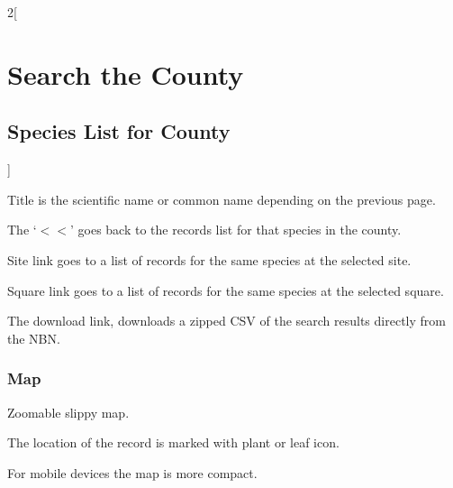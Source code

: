 \documentclass[a4paper,12pt,landscape]{article}
\begin{document}
\begin{multicols*}{2}[%
  \section{Search the County}%
  \subsection{Species List for County}%
  \label{sec:species-list-for-county}%
]
\begin{todolist}
  \item Title is the scientific name or common name depending on the previous page.
  \item The `$<<$' goes back to the records list for that species in the county.
  \item Site link goes to a list of records for the same species at the selected site.
  \item Square link goes to a list of records for the same species at the selected square.
  \item The download link, downloads a zipped CSV of the search results directly from the NBN.
\end{todolist}

\subsubsection*{Map} 

\begin{todolist}
  \item Zoomable slippy map.
  \item The location of the record is marked with plant or leaf icon.
  \item For mobile devices the map is more compact.
\end{todolist}

\end{multicols*}
\end{document}
